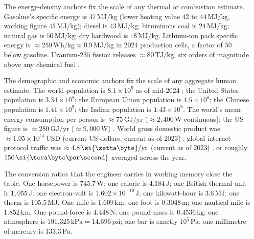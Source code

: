 The energy-density anchors fix the scale of any thermal or
combustion estimate. Gasoline's specific energy is $47 \,
\si{\mega\joule\per\kilogram}$ (lower heating value $42$ to $44
\,\si{\mega\joule\per\kilogram}$, working figure $45 \,
\si{\mega\joule\per\kilogram}$); diesel is $43 \,
\si{\mega\joule\per\kilogram}$; bituminous coal is $24 \,
\si{\mega\joule\per\kilogram}$; natural gas is $50 \,
\si{\mega\joule\per\kilogram}$; dry hardwood is $18 \,
\si{\mega\joule\per\kilogram}$. Lithium-ion pack specific energy
is $\approx 250 \,\si{\watt\hour\per\kilogram} \approx 0.9 \,
\si{\mega\joule\per\kilogram}$ in $2024$ production cells, a
factor of $50$ below gasoline. Uranium-$235$ fission releases
$\approx 80 \,\si{\tera\joule\per\kilogram}$, six orders of
magnitude above any chemical fuel
\cite{data:ch09t3b-energy-densities-2023}.

The demographic and economic anchors fix the scale of any
aggregate human estimate. The world population is $8.1 \times
10^{9}$ as of mid-$2024$ \cite{data:ch09t3b-un-wpp-2024}; the
United States population is $3.34 \times 10^{8}$; the European
Union population is $4.5 \times 10^{8}$; the Chinese population
is $1.41 \times 10^{9}$; the Indian population is $1.43 \times
10^{9}$. The world's mean energy consumption per person is
$\approx 75 \,\si{\giga\joule}/\text{yr}$ ($\approx 2{,}400 \,
\si{\watt}$ continuous); the US figure is $\approx 280 \,
\si{\giga\joule}/\text{yr}$ ($\approx 9{,}000 \,\si{\watt}$)
\cite{data:ch09t3b-iea-wer-2024}. World gross domestic product
was $\approx 1.05 \times 10^{14} \,\text{USD}$ (current US dollars,
current as of $2023$) \cite{data:ch09t3b-wb-gdp-2024}; global
internet protocol traffic was $\approx 4.8 \,
\si{\zetta\byte}/\text{yr}$ (current as of $2023$)
\cite{data:ch09t3b-cisco-visual-2020}, or roughly $150 \,
\si{\tera\byte\per\second}$ averaged across the year.

The conversion ratios that the engineer carries in working memory
close the table. One horsepower is $745.7 \,\si{\watt}$; one
calorie is $4.184 \,\si{\joule}$; one British thermal unit is
$1{,}055 \,\si{\joule}$; one electron-volt is $1.602 \times
10^{-19} \,\si{\joule}$; one kilowatt-hour is $3.6 \,
\si{\mega\joule}$; one therm is $105.5 \,\si{\mega\joule}$. One
mile is $1.609 \,\si{\kilo\meter}$; one foot is $0.3048 \,
\si{\meter}$; one nautical mile is $1.852 \,\si{\kilo\meter}$. One
pound-force is $4.448 \,\si{\newton}$; one pound-mass is $0.4536
\,\si{\kilogram}$; one atmosphere is $101.325 \,
\si{\kilo\pascal} = 14.696 \,\text{psi}$; one bar is exactly
$10^{5} \,\si{\pascal}$; one millimetre of mercury is $133.3 \,
\si{\pascal}$.

